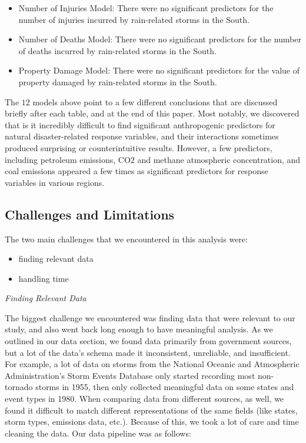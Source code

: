 \documentclass[10pt,]{article}
\begin{document}
\begin{itemize}
  \item Number of Injuries Model: There were no significant predictors for the number of injuries incurred by rain-related storms in the South.
  \item Number of Deaths Model: There were no significant predictors for the number of deaths incurred by rain-related storms in the South.
  \item Property Damage Model: There were no significant predictors for the value of property damaged by rain-related storms in the South.
\end{itemize}

\medskip

The \(12\) models above point to a few different conclusions that are
discussed briefly after each table, and at the end of this paper. Most
notably, we discovered that is it incredibly difficult to find
significant anthropogenic predictors for natural disaster-related
response variables, and their interactions sometimes produced surprising
or counterintuitive results. However, a few predictors, including
petroleum emissions, CO\(2\) and methane atmospheric concentration, and
coal emissions appeared a few times as significant predictors for
response variables in various regions.

\newpage

\subsection{Challenges and
Limitations}\label{challenges-and-limitations}

The two main challenges that we encountered in this analysis were:

\begin{itemize}
  \item finding relevant data
  \item handling time
\end{itemize}

\textit{Finding Relevant Data}

The biggest challenge we encountered was finding data that were relevant
to our study, and also went back long enough to have meaningful
analysis. As we outlined in our data section, we found data primarily
from government sources, but a lot of the data's schema made it
inconsistent, unreliable, and insufficient. For example, a lot of data
on storms from the National Oceanic and Atmospheric Administration's
Storm Events Database only started recording most non-tornado storms in
1955, then only collected meaningful data on some states and event types
in 1980. When comparing data from different sources, as well, we found
it difficult to match different representations of the same fields (like
states, storm types, emissions data, etc.). Because of this, we took a
lot of care and time cleaning the data. Our data pipeline was as
follows:
\end{document}

